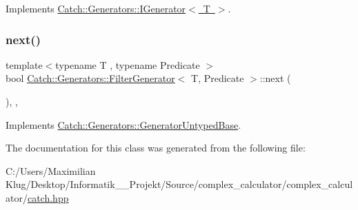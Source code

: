 Implements \mbox{\hyperlink{struct_catch_1_1_generators_1_1_i_generator_a525d381fc9249a885b075a0632a8579a}{Catch\+::\+Generators\+::\+I\+Generator$<$ T $>$}}.

\mbox{\label{class_catch_1_1_generators_1_1_filter_generator_a02ce0839dcaa7545c55d0fe70cc50e84}} 
\subsubsection{\texorpdfstring{next()}{next()}}
{\footnotesize\ttfamily template$<$typename T , typename Predicate $>$ \\
bool \mbox{\hyperlink{class_catch_1_1_generators_1_1_filter_generator}{Catch\+::\+Generators\+::\+Filter\+Generator}}$<$ T, Predicate $>$\+::next (\begin{DoxyParamCaption}{ }\end{DoxyParamCaption})\hspace{0.3cm}{\ttfamily [inline]}, {\ttfamily [override]}, {\ttfamily [virtual]}}



Implements \mbox{\hyperlink{class_catch_1_1_generators_1_1_generator_untyped_base_aeed3c0cd6233c5f553549e453b8d6638}{Catch\+::\+Generators\+::\+Generator\+Untyped\+Base}}.



The documentation for this class was generated from the following file\+:\begin{DoxyCompactItemize}
\item 
C\+:/\+Users/\+Maximilian Klug/\+Desktop/\+Informatik\+\_\+\_\+\+Projekt/\+Source/complex\+\_\+calculator/complex\+\_\+calculator/\mbox{\hyperlink{catch_8hpp}{catch.\+hpp}}\end{DoxyCompactItemize}
